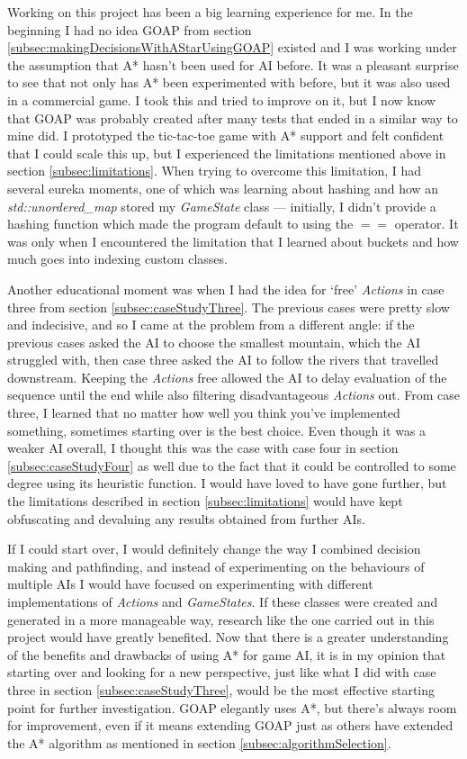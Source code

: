 \documentclass[11pt, a4paper]{report}
\begin{document}
Working on this project has been a big learning experience for me. In the beginning I had no idea GOAP from section \ref{subsec:makingDecisionsWithAStarUsingGOAP} existed and I was working under the assumption that A* hasn't been used for AI before. It was a pleasant surprise to see that not only has A* been experimented with before, but it was also used in a commercial game. I took this and tried to improve on it, but I now know that GOAP was probably created after many tests that ended in a similar way to mine did. I prototyped the tic-tac-toe game with A* support and felt confident that I could scale this up, but I experienced the limitations mentioned above in section \ref{subsec:limitations}. When trying to overcome this limitation, I had several eureka moments, one of which was learning about hashing and how an \emph{std::unordered\_map} stored my \emph{GameState} class --- initially, I didn't provide a hashing function which made the program default to using the $==$ operator. It was only when I encountered the limitation that I learned about buckets and how much goes into indexing custom classes. 

Another educational moment was when I had the idea for `free' \emph{Actions} in case three from section \ref{subsec:caseStudyThree}. The previous cases were pretty slow and indecisive, and so I came at the problem from a different angle: if the previous cases asked the AI to choose the smallest mountain, which the AI struggled with, then case three asked the AI to follow the rivers that travelled downstream. Keeping the \emph{Actions} free allowed the AI to delay evaluation of the sequence until the end while also filtering disadvantageous \emph{Actions} out. From case three, I learned that no matter how well you think you've implemented something, sometimes starting over is the best choice. Even though it was a weaker AI overall, I thought this was the case with case four in section \ref{subsec:caseStudyFour} as well due to the fact that it could be controlled to some degree using its heuristic function. I would have loved to have gone further, but the limitations described in section \ref{subsec:limitations} would have kept obfuscating and devaluing any results obtained from further AIs. 

If I could start over, I would definitely change the way I combined decision making and pathfinding, and instead of experimenting on the behaviours of multiple AIs I would have focused on experimenting with different implementations of \emph{Actions} and \emph{GameStates}. If these classes were created and generated in a more manageable way, research like the one carried out in this project would have greatly benefited. Now that there is a greater understanding of the benefits and drawbacks of using A* for game AI, it is in my opinion that starting over and looking for a new perspective, just like what I did with case three in section \ref{subsec:caseStudyThree}, would be the most effective starting point for further investigation. GOAP elegantly uses A*, but there's always room for improvement, even if it means extending GOAP just as others have extended the A* algorithm as mentioned in section \ref{subsec:algorithmSelection}.
\end{document}
